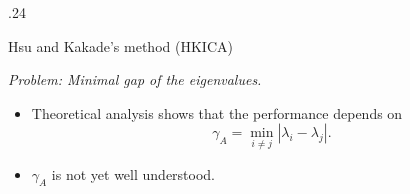 \documentclass[final]{beamer} %
\begin{document}
\begin{frame}[c]
\begin{columns}[t,totalwidth=\textwidth]
\begin{column} {.24\textwidth}
\begin{block}{Hsu and Kakade's method (HKICA)}
\begin{figure}
			\end{figure}
			\vspace{1cm}
			{\it\large{Problem: Minimal gap of the eigenvalues.}}
			\begin{itemize}
				\item Theoretical analysis shows that the performance depends on 
					\[
					\gamma_A = \min_{i\neq j} \left\vert \lambda_i - \lambda_j\right \vert.
					\]
				\vspace{-1cm}
				\item $\gamma_A$ is not yet well understood.
			\end{itemize}
		\end{block}
	\end{column}


\end{columns}
\end{frame}
\end{document}
